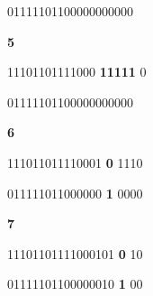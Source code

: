          01111101100000000000                          

\textbf{          5         }

         11101101111000         \textbf{          11111         }         0                          

         01111101100000000000                          

\textbf{          6         }

         111011011110001         \textbf{          0         }         1110                          

         011111011000000         \textbf{          1         }         0000                          

\textbf{          7         }

         11101101111000101         \textbf{          0         }         10                          

         01111101100000010         \textbf{          1         }         00